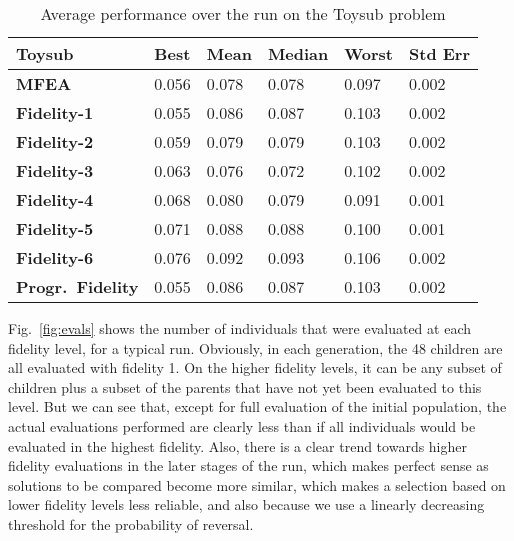 \begin{table}[!ht]\footnotesize
	\centering
	\caption{Average performance over the run on the Toysub problem}
	\label{tab:toysubArea}
	\begin{tabular}{l|l|l|l|l|l}
		\hline
		\textbf{Toysub}               & \textbf{Best} & \textbf{Mean} & \textbf{Median} & \textbf{Worst} & \textbf{Std Err} \\ \hline
		\textbf{MFEA}           & 0.056         & 0.078         & 0.078           & 0.097          & 0.002        \\ 
		\textbf{Fidelity-1}           & 0.055         & 0.086         & 0.087           & 0.103          & 0.002        \\ 
		\textbf{Fidelity-2}           & 0.059         & 0.079         & 0.079           & 0.103          & 0.002        \\ 
		\textbf{Fidelity-3}           & 0.063         & 0.076         & 0.072           & 0.102          & 0.002        \\ 
		\textbf{Fidelity-4}           & 0.068         & 0.080         & 0.079           & 0.091          & 0.001        \\ 
		\textbf{Fidelity-5}           & 0.071         & 0.088         & 0.088           & 0.100          & 0.001        \\ 
		\textbf{Fidelity-6}           & 0.076         & 0.092         & 0.093           & 0.106          & 0.002        \\ 
		\textbf{Progr.\ Fidelity} & 0.055         & 0.086         & 0.087           & 0.103          & 0.002        \\ \hline
	\end{tabular}
\end{table}


Fig.~\ref{fig:evals} shows the number of individuals that were evaluated at each fidelity level, for a typical run. Obviously, in each generation, the 48 children are all evaluated with fidelity 1. On the higher fidelity levels, it can be any subset of children plus a subset of the parents that have not yet been evaluated to this level. But we can see that, except for full evaluation of the initial population, the actual evaluations performed are clearly less than if all individuals would be evaluated in the highest fidelity. Also, there is a clear trend towards higher fidelity evaluations in the later stages of the run, which makes perfect sense as solutions to be compared become more similar, which makes a selection based on lower fidelity levels less reliable, and also because we use a linearly decreasing threshold for the probability of reversal.

